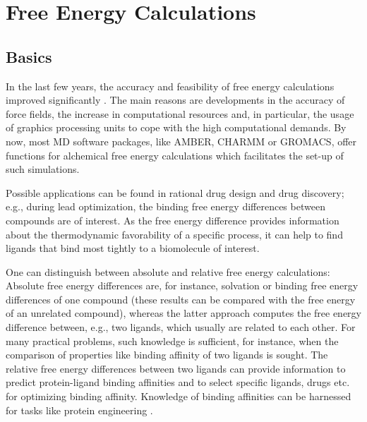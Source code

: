 \chapter{Free Energy Calculations}

\section{Basics}

In the last few years, the accuracy and feasibility of free energy calculations
improved significantly \cite{King.2021}. The main reasons are developments
in the accuracy of force fields\cite{Cournia.2017}, the increase
in computational resources and, in particular, the usage of graphics
processing units to cope with the high computational demands. By now,
most MD software packages, like AMBER\cite{DavidA.Case.2005}, CHARMM\cite{Brooks.2009} or GROMACS\cite{Abraham.2015}, offer functions
for alchemical free energy calculations which facilitates the set-up
of such simulations. 

Possible applications can be found in rational drug design and drug
discovery; e.g., during lead optimization, the binding free energy differences
between compounds are of interest.\cite{Cournia.2017} As the free energy difference
 provides information about the thermodynamic favorability of a specific
process, it can help to find ligands that bind most tightly to a biomolecule of
interest.

One can distinguish between absolute and relative free energy calculations:
Absolute free energy differences are, for instance, solvation or binding
free energy differences of one compound (these results can be compared
with the free energy of an unrelated compound)\cite{Boresch.2003,Jorgensen.1988},
whereas the latter approach computes the free energy difference between,
e.g., two ligands, which usually are related to each other. For many
practical problems, such knowledge is sufficient, for instance, when
the comparison of properties like binding affinity of two ligands
is sought. The relative free energy differences between two ligands
can provide information to predict protein-ligand binding affinities
and to select specific ligands, drugs etc. for optimizing binding
affinity. Knowledge of binding affinities can be harnessed for tasks
like protein engineering \cite{King.2021}.

